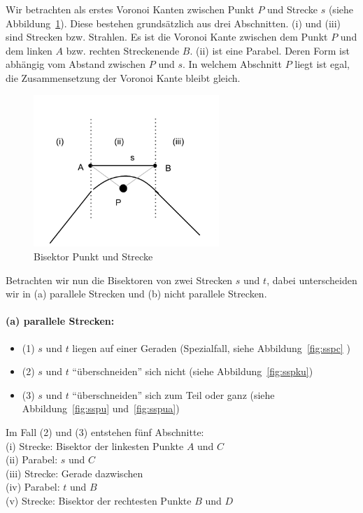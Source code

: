 Wir betrachten als erstes Voronoi Kanten zwischen Punkt $P$ und Strecke $s$ (siehe Abbildung~\ref{fig:ps}). Diese bestehen grundsätzlich aus drei Abschnitten. (i) und (iii) sind Strecken bzw. Strahlen. Es ist die Voronoi Kante zwischen dem Punkt $P$ und dem linken $A$ bzw. rechten Streckenende $B$. (ii) ist eine Parabel. Deren Form ist abhängig vom Abstand zwischen $P$ und $s$. In welchem Abschnitt $P$ liegt ist egal, die Zusammensetzung der Voronoi Kante bleibt gleich.

\begin{figure}[h!]
\begin{center}
\includegraphics[width=7cm]{img/punkt-strecke.png}
\end{center}
\caption{Bisektor Punkt und Strecke}
\label{fig:ps}
\end{figure}

Betrachten wir nun die Bisektoren von zwei Strecken $s$ und $t$, dabei unterscheiden wir in (a) parallele Strecken und (b) nicht parallele Strecken.

\paragraph*{(a) parallele Strecken:}

\begin{itemize}
\item (1) $s$ und $t$ liegen auf einer Geraden (Spezialfall, siehe Abbildung~\ref{fig:sspc} )
\item (2) $s$ und $t$ "`überschneiden"' sich nicht (siehe Abbildung~\ref{fig:sspku})
\item (3) $s$ und $t$ "`überschneiden"' sich zum Teil oder ganz (siehe Abbildung~\ref{fig:sspu} und~\ref{fig:sspua})
\end{itemize}

Im Fall (2) und (3) entstehen fünf Abschnitte:\\
(i) Strecke: Bisektor der linkesten Punkte $A$ und $C$\\
(ii) Parabel: $s$ und $C$\\
(iii) Strecke: Gerade dazwischen\\
(iv) Parabel: $t$ und $B$\\
(v) Strecke: Bisektor der rechtesten Punkte $B$ und $D$\\

